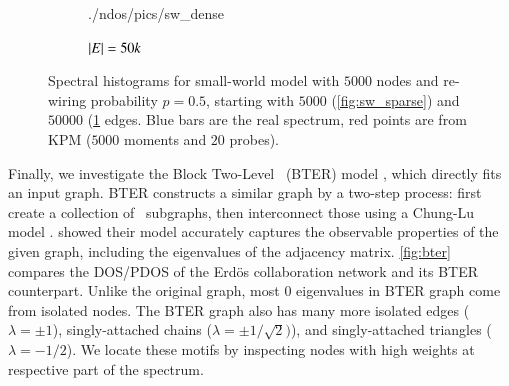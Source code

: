 \begin{figure}[ht]
\begin{subfigure}{0.47\textwidth}
    {./ndos/pics/sw_dense}
    \caption{$\left\lvert E\right\rvert=50k$}\label{fig:sw_dense}
  \end{subfigure}
  \caption{Spectral histograms for small-world model with $5000$ nodes and
  re-wiring probability $p=0.5$, starting with $5000$ (\ref{fig:sw_sparse}) and
  $50000$ (\ref{fig:sw_dense} edges. Blue bars are the real spectrum, red points
  are from KPM ($5000$ moments and $20$ probes).} \label{fig:sw}
\end{figure}

Finally, we investigate the Block Two-Level \ErdosRenyi\ (BTER) model 
\cite{seshadhri2012community}, which directly fits an input graph. BTER
constructs a similar graph by a two-step process: first create a collection of
\ErdosRenyi\ subgraphs, then interconnect those using a Chung-Lu model  
\cite{chung2002connected}. \citeauthor{seshadhri2012community} showed their
model accurately captures the observable properties of the given graph,
including the eigenvalues of the adjacency matrix. \cref{fig:bter} compares the
DOS/PDOS of the Erd\"{o}s collaboration network and its BTER counterpart. Unlike
the original graph, most $0$ eigenvalues in BTER graph come from isolated nodes.
The BTER graph also has many more isolated edges ($\lambda=\pm1$),
singly-attached chains ($\lambda=\pm1/\sqrt{2})$), and singly-attached triangles
($\lambda=-1/2$). We locate these motifs by inspecting nodes with high weights
at respective part of the spectrum.

